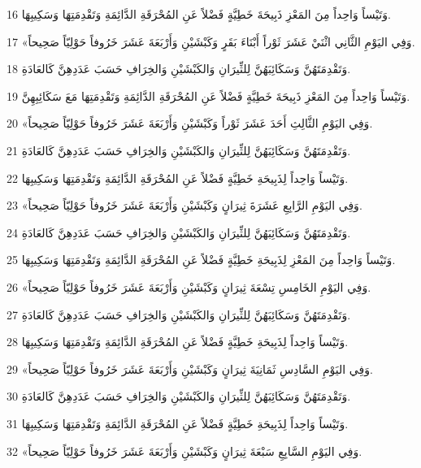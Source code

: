 \par 16 وَتَيْساً وَاحِداً مِنَ المَعْزِ ذَبِيحَةَ خَطِيَّةٍ فَضْلاً عَنِ المُحْرَقَةِ الدَّائِمَةِ وَتَقْدِمَتِهَا وَسَكِيبِهَا.
\par 17 «وَفِي اليَوْمِ الثَّانِي اثْنَيْ عَشَرَ ثَوْراً أَبْنَاءَ بَقَرٍ وَكَبْشَيْنِ وَأَرْبَعَةَ عَشَرَ خَرُوفاً حَوْلِيّاً صَحِيحاً.
\par 18 وَتَقْدِمَتَهُنَّ وَسَكَائِبَهُنَّ لِلثِّيرَانِ وَالكَبْشَيْنِ وَالخِرَافِ حَسَبَ عَدَدِهِنَّ كَالعَادَةِ.
\par 19 وَتَيْساً وَاحِداً مِنَ المَعْزِ ذَبِيحَةَ خَطِيَّةٍ فَضْلاً عَنِ المُحْرَقَةِ الدَّائِمَةِ وَتَقْدِمَتِهَا مَعَ سَكَائِبِهِنَّ.
\par 20 «وَفِي اليَوْمِ الثَّالِثِ أَحَدَ عَشَرَ ثَوْراً وَكَبْشَيْنِ وَأَرْبَعَةَ عَشَرَ خَرُوفاً حَوْلِيّاً صَحِيحاً.
\par 21 وَتَقْدِمَتَهُنَّ وَسَكَائِبَهُنَّ لِلثِّيرَانِ وَالكَبْشَيْنِ وَالخِرَافِ حَسَبَ عَدَدِهِنَّ كَالعَادَةِ.
\par 22 وَتَيْساً وَاحِداً لِذَبِيحَةِ خَطِيَّةٍ فَضْلاً عَنِ المُحْرَقَةِ الدَّائِمَةِ وَتَقْدِمَتِهَا وَسَكِيبِهَا.
\par 23 «وَفِي اليَوْمِ الرَّابِعِ عَشَرَةَ ثِيرَانٍ وَكَبْشَيْنِ وَأَرْبَعَةَ عَشَرَ خَرُوفاً حَوْلِيّاً صَحِيحاً.
\par 24 وَتَقْدِمَتَهُنَّ وَسَكَائِبَهُنَّ لِلثِّيرَانِ وَالكَبْشَيْنِ وَالخِرَافِ حَسَبَ عَدَدِهِنَّ كَالعَادَةِ.
\par 25 وَتَيْساً وَاحِداً مِنَ المَعْزِ لِذَبِيحَةِ خَطِيَّةٍ فَضْلاً عَنِ المُحْرَقَةِ الدَّائِمَةِ وَتَقْدِمَتِهَا وَسَكِيبِهَا.
\par 26 «وَفِي اليَوْمِ الخَامِسِ تِسْعَةَ ثِيرَانٍ وَكَبْشَيْنِ وَأَرْبَعَةَ عَشَرَ خَرُوفاً حَوْلِيّاً صَحِيحاً.
\par 27 وَتَقْدِمَتَهُنَّ وَسَكَائِبَهُنَّ لِلثِّيرَانِ وَالكَبْشَيْنِ وَالخِرَافِ حَسَبَ عَدَدِهِنَّ كَالعَادَةِ.
\par 28 وَتَيْساً وَاحِداً لِذَبِيحَةِ خَطِيَّةٍ فَضْلاً عَنِ المُحْرَقَةِ الدَّائِمَةِ وَتَقْدِمَتِهَا وَسَكِيبِهَا.
\par 29 «وَفِي اليَوْمِ السَّادِسِ ثَمَانِيَةَ ثِيرَانٍ وَكَبْشَيْنِ وَأَرْبَعَةَ عَشَرَ خَرُوفاً حَوْلِيّاً صَحِيحاً.
\par 30 وَتَقْدِمَتَهُنَّ وَسَكَائِبَهُنَّ لِلثِّيرَانِ وَالكَبْشَيْنِ وَالخِرَافِ حَسَبَ عَدَدِهِنَّ كَالعَادَةِ.
\par 31 وَتَيْساً وَاحِداً لِذَبِيحَةِ خَطِيَّةٍ فَضْلاً عَنِ المُحْرَقَةِ الدَّائِمَةِ وَتَقْدِمَتِهَا وَسَكِيبِهَا.
\par 32 «وَفِي اليَوْمِ السَّابِعِ سَبْعَةَ ثِيرَانٍ وَكَبْشَيْنِ وَأَرْبَعَةَ عَشَرَ خَرُوفاً حَوْلِيّاً صَحِيحاً.
